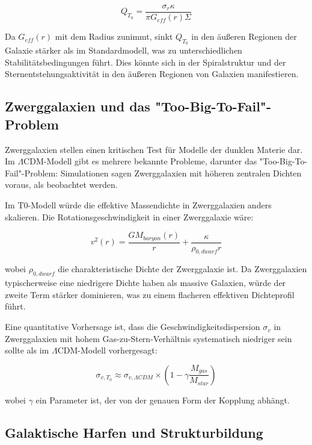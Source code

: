 \documentclass[a4paper,12pt]{article}
\begin{document}
\begin{equation}
	Q_{T_0} = \frac{\sigma_r \kappa}{\pi G_{eff}(r) \Sigma}
\end{equation}

Da $G_{eff}(r)$ mit dem Radius zunimmt, sinkt $Q_{T_0}$ in den äußeren Regionen der Galaxie stärker als im Standardmodell, was zu unterschiedlichen Stabilitätsbedingungen führt. Dies könnte sich in der Spiralstruktur und der Sternentstehungsaktivität in den äußeren Regionen von Galaxien manifestieren.

\subsection{Zwerggalaxien und das "Too-Big-To-Fail"-Problem}

Zwerggalaxien stellen einen kritischen Test für Modelle der dunklen Materie dar. Im $\Lambda$CDM-Modell gibt es mehrere bekannte Probleme, darunter das "Too-Big-To-Fail"-Problem: Simulationen sagen Zwerggalaxien mit höheren zentralen Dichten voraus, als beobachtet werden.

Im T0-Modell würde die effektive Massendichte in Zwerggalaxien anders skalieren. Die Rotationsgeschwindigkeit in einer Zwerggalaxie wäre:

\begin{equation}
	v^2(r) = \frac{GM_{baryon}(r)}{r} + \frac{\kappa}{\rho_{0,dwarf}r}
\end{equation}

wobei $\rho_{0,dwarf}$ die charakteristische Dichte der Zwerggalaxie ist. Da Zwerggalaxien typischerweise eine niedrigere Dichte haben als massive Galaxien, würde der zweite Term stärker dominieren, was zu einem flacheren effektiven Dichteprofil führt.

Eine quantitative Vorhersage ist, dass die Geschwindigkeitsdispersion $\sigma_v$ in Zwerggalaxien mit hohem Gas-zu-Stern-Verhältnis systematisch niedriger sein sollte als im $\Lambda$CDM-Modell vorhergesagt:

\begin{equation}
	\sigma_{v,T_0} \approx \sigma_{v,\Lambda CDM} \times \left(1 - \gamma \frac{M_{gas}}{M_{star}}\right)
\end{equation}

wobei $\gamma$ ein Parameter ist, der von der genauen Form der Kopplung abhängt.

\subsection{Galaktische Harfen und Strukturbildung}
\end{document}
